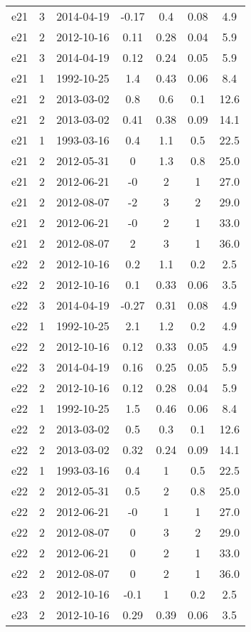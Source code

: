 \begin{longtable}{ccccccc}
e21 & 3 & 2014-04-19 & -0.17 & 0.4 & 0.08 & 4.9 \\
e21 & 2 & 2012-10-16 & 0.11 & 0.28 & 0.04 & 5.9 \\
e21 & 3 & 2014-04-19 & 0.12 & 0.24 & 0.05 & 5.9 \\
e21 & 1 & 1992-10-25 & 1.4 & 0.43 & 0.06 & 8.4 \\
e21 & 2 & 2013-03-02 & 0.8 & 0.6 & 0.1 & 12.6 \\
e21 & 2 & 2013-03-02 & 0.41 & 0.38 & 0.09 & 14.1 \\
e21 & 1 & 1993-03-16 & 0.4 & 1.1 & 0.5 & 22.5 \\
e21 & 2 & 2012-05-31 & 0 & 1.3 & 0.8 & 25.0 \\
e21 & 2 & 2012-06-21 & -0 & 2 & 1 & 27.0 \\
e21 & 2 & 2012-08-07 & -2 & 3 & 2 & 29.0 \\
e21 & 2 & 2012-06-21 & -0 & 2 & 1 & 33.0 \\
e21 & 2 & 2012-08-07 & 2 & 3 & 1 & 36.0 \\
e22 & 2 & 2012-10-16 & 0.2 & 1.1 & 0.2 & 2.5 \\
e22 & 2 & 2012-10-16 & 0.1 & 0.33 & 0.06 & 3.5 \\
e22 & 3 & 2014-04-19 & -0.27 & 0.31 & 0.08 & 4.9 \\
e22 & 1 & 1992-10-25 & 2.1 & 1.2 & 0.2 & 4.9 \\
e22 & 2 & 2012-10-16 & 0.12 & 0.33 & 0.05 & 4.9 \\
e22 & 3 & 2014-04-19 & 0.16 & 0.25 & 0.05 & 5.9 \\
e22 & 2 & 2012-10-16 & 0.12 & 0.28 & 0.04 & 5.9 \\
e22 & 1 & 1992-10-25 & 1.5 & 0.46 & 0.06 & 8.4 \\
e22 & 2 & 2013-03-02 & 0.5 & 0.3 & 0.1 & 12.6 \\
e22 & 2 & 2013-03-02 & 0.32 & 0.24 & 0.09 & 14.1 \\
e22 & 1 & 1993-03-16 & 0.4 & 1 & 0.5 & 22.5 \\
e22 & 2 & 2012-05-31 & 0.5 & 2 & 0.8 & 25.0 \\
e22 & 2 & 2012-06-21 & -0 & 1 & 1 & 27.0 \\
e22 & 2 & 2012-08-07 & 0 & 3 & 2 & 29.0 \\
e22 & 2 & 2012-06-21 & 0 & 2 & 1 & 33.0 \\
e22 & 2 & 2012-08-07 & 0 & 2 & 1 & 36.0 \\
e23 & 2 & 2012-10-16 & -0.1 & 1 & 0.2 & 2.5 \\
e23 & 2 & 2012-10-16 & 0.29 & 0.39 & 0.06 & 3.5 \\

\end{longtable}
